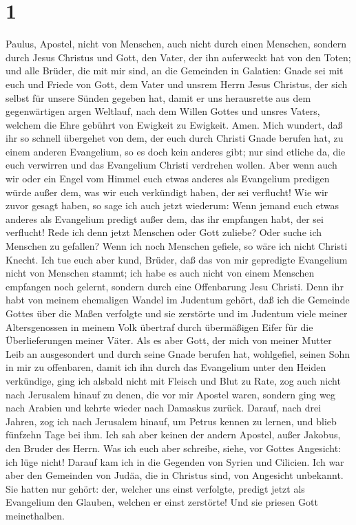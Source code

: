 \hypertarget{section}{%
\section{1}\label{section}}

 Paulus, Apostel, nicht von Menschen, auch nicht durch
einen Menschen, sondern durch Jesus Christus und Gott, den Vater, der
ihn auferweckt hat von den Toten;  und alle Brüder, die
mit mir sind, an die Gemeinden in Galatien:  Gnade sei mit
euch und Friede von Gott, dem Vater und unsrem Herrn Jesus Christus,
 der sich selbst für unsere Sünden gegeben hat, damit er
uns herausrette aus dem gegenwärtigen argen Weltlauf, nach dem Willen
Gottes und unsres Vaters,  welchem die Ehre gebührt von
Ewigkeit zu Ewigkeit. Amen.  Mich wundert, daß ihr so
schnell übergehet von dem, der euch durch Christi Gnade berufen hat, zu
einem anderen Evangelium, so es doch kein anderes gibt; 
nur sind etliche da, die euch verwirren und das Evangelium Christi
verdrehen wollen.  Aber wenn auch wir oder ein Engel vom
Himmel euch etwas anderes als Evangelium predigen würde außer dem, was
wir euch verkündigt haben, der sei verflucht!  Wie wir
zuvor gesagt haben, so sage ich auch jetzt wiederum: Wenn jemand euch
etwas anderes als Evangelium predigt außer dem, das ihr empfangen habt,
der sei verflucht!  Rede ich denn jetzt Menschen oder
Gott zuliebe? Oder suche ich Menschen zu gefallen? Wenn ich noch
Menschen gefiele, so wäre ich nicht Christi Knecht.  Ich
tue euch aber kund, Brüder, daß das von mir gepredigte Evangelium nicht
von Menschen stammt;  ich habe es auch nicht von einem
Menschen empfangen noch gelernt, sondern durch eine Offenbarung Jesu
Christi.  Denn ihr habt von meinem ehemaligen Wandel im
Judentum gehört, daß ich die Gemeinde Gottes über die Maßen verfolgte
und sie zerstörte  und im Judentum viele meiner
Altersgenossen in meinem Volk übertraf durch übermäßigen Eifer für die
Überlieferungen meiner Väter.  Als es aber Gott, der mich
von meiner Mutter Leib an ausgesondert und durch seine Gnade berufen
hat, wohlgefiel,  seinen Sohn in mir zu offenbaren, damit
ich ihn durch das Evangelium unter den Heiden verkündige, ging ich
alsbald nicht mit Fleisch und Blut zu Rate,  zog auch
nicht nach Jerusalem hinauf zu denen, die vor mir Apostel waren, sondern
ging weg nach Arabien und kehrte wieder nach Damaskus zurück.
 Darauf, nach drei Jahren, zog ich nach Jerusalem hinauf,
um Petrus kennen zu lernen, und blieb fünfzehn Tage bei ihm.
 Ich sah aber keinen der andern Apostel, außer Jakobus,
den Bruder des Herrn.  Was ich euch aber schreibe, siehe,
vor Gottes Angesicht: ich lüge nicht!  Darauf kam ich in
die Gegenden von Syrien und Cilicien.  Ich war aber den
Gemeinden von Judäa, die in Christus sind, von Angesicht unbekannt.
 Sie hatten nur gehört: der, welcher uns einst verfolgte,
predigt jetzt als Evangelium den Glauben, welchen er einst zerstörte!
 Und sie priesen Gott meinethalben.

